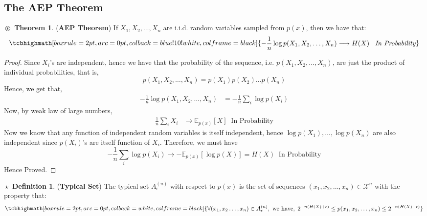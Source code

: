 \documentclass{article}
\theoremstyle{definition}
\newtheorem{definition}{$\boxed{\star}$ Definition}
\newtheorem{theorem}{$\boxed{\boxed{\circledast}}$ Theorem}
\theoremstyle{remark}
\theoremstyle{definition}
\theoremstyle{definition}
\theoremstyle{definition}
\newcommand{\expec}[2]{\mathbb{E}_{#1}\left[ #2\right]}
\newcommand{\supp}[1]{\mathcal{#1}}
\newcommand{\tset}[2]{A_{#1}^{(#2)}}
\newcommand{\defeq}[1]{
		\tcbhighmath[boxrule=2pt,arc=0pt,colback=white,colframe=black]{\begin{aligned}
				#1
		\end{aligned}}
	}
\newcommand{\theoreq}[1]{
		\tcbhighmath[boxrule=2pt,arc=0pt,colback=blue!10!white,colframe=black]{\begin{aligned}
				#1
		\end{aligned}}}
\begin{document}
\subsection{The AEP Theorem}
\begin{theorem}
	(\textbf{AEP Theorem}) If $ X_1,X_2,\dots, X_n $ are i.i.d. random variables sampled from $ p(x) $, then we have that:
	\begin{equation}
		\theoreq{-\frac{1}{n}\log p(X_1,X_2,\dots,X_n) \longrightarrow H(X)\;\;\;\text{\emph{In Probability}}}
	\end{equation}
\end{theorem}
\begin{proof}
	Since $ X_i $'s are independent, hence we have that the probability of the sequence, i.e. $ p(X_1,X_2,\dots, X_n) $, are just the product of individual probabilities, that is,
	\[p(X_1,X_2,\dots,X_n) = p(X_1)p(X_2)\dots p(X_n)\]
	Hence, we get that,
	\begin{equation*}
		\begin{split}
			-\frac{1}{n}\log p(X_1,X_2,\dots,X_n) &= -\frac{1}{n}\sum_{i} \log p(X_i)
		\end{split}
	\end{equation*}
Now, by weak law of large numbers, 
\begin{equation*}
	\begin{split}
		\frac{1}{n}\sum_{i} X_i &\longrightarrow \expec{p(x)}{X}\;\;\text{In Probability} 
	\end{split}
\end{equation*}
Now we know that any function of independent random variables is itself independent, hence $ \log p(X_1), \dots,\log p(X_n) $ are also independent since $ p(X_i) $'s are itself function of $ X_i $. Therefore, we must have
\[-\frac{1}{n}\sum_{i} \log p(X_i) \longrightarrow -\expec{p(x)}{\log p(X)} = H(X)\;\;\text{In Probability}\]
Hence Proved.
\end{proof}
\hrulefill
\begin{definition}
	(\textbf{Typical Set}) The typical set $ \tset{\epsilon}{n} $ with respect to $ p(x) $ is the set of sequences $ (x_1,x_2,\dots,x_n) \in \supp{X}^n$ with the property that:
	\begin{equation}
		\defeq{\forall (x_1,x_2\dots,x_n)\in \tset{\epsilon}{n},\text{ we have},\;2^{-n(H(X) + \epsilon)} \le p(x_1, x_2,\dots,x_n)\le 2^{-n(H(X) - \epsilon)}}
	\end{equation}	
\end{definition}
\hrulefill
\newpage
\end{document}
